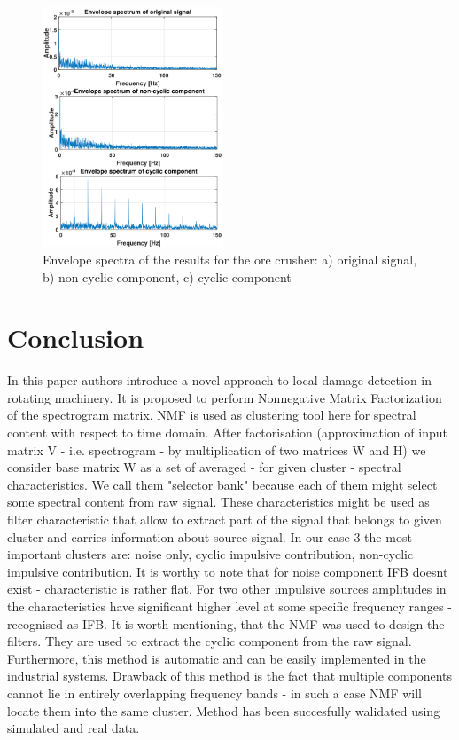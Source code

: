 \documentclass[journal]{IEEEtran}
\begin{document}
\begin{figure}[!ht]
\centering
\includegraphics[width = 0.48\textwidth]{figs3/widma.png}
\caption{Envelope spectra of the results for the ore crusher: a) original signal, b) non-cyclic component, c) cyclic component}
\label{fig: widma2}
\end{figure}

\section{Conclusion}


In this paper authors introduce a novel approach to local damage detection in rotating machinery. It is proposed to perform Nonnegative Matrix Factorization of the spectrogram matrix. NMF is used as clustering tool here for spectral content with respect to time domain. After factorisation (approximation of input matrix V - i.e. spectrogram - by multiplication of two matrices W and H)  we consider base matrix W as a set of averaged - for given cluster - spectral characteristics. We call them "selector bank" because each of them might select some spectral content from raw signal. These characteristics might be used as filter characteristic that allow to extract part of the signal that belongs to given cluster and carries information about source signal. In our case 3 the most important clusters are: noise only, cyclic impulsive contribution, non-cyclic impulsive contribution. It is worthy to note that for noise component IFB doesnt exist - characteristic is rather flat. For two other impulsive sources amplitudes in the characteristics have significant higher level at some specific frequency ranges - recognised as IFB. It is worth mentioning, that the NMF was used to design the filters. They are used to extract the cyclic component from the raw signal. Furthermore, this method is automatic and can be easily implemented in the industrial systems. Drawback of this method is the fact that multiple components cannot lie in entirely overlapping frequency bands - in such a case NMF will locate them into the same cluster. Method has been succesfully walidated using simulated and real data.
\end{document}
